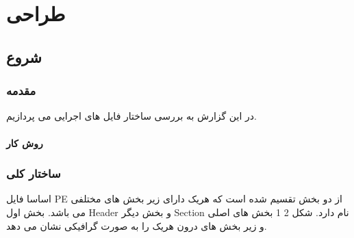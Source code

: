 \documentclass{report}
\begin{document}
    
	\part{طراحی}
	\chapter{شروع}
	\section{مقدمه}
	در این گزارش به بررسی ساختار فایل های اجرایی می پردازیم.
	\subsection{روش کار}
	
	\section{ساختار کلی}
	اساسا فایل PE از دو بخش تقسیم شده است که هریک دارای زیر بخش های مختلفی می باشد. بخش اول Header و بخش دیگر Section نام دارد. شکل ‏2 1 بخش های اصلی و زیر بخش های درون هریک را به صورت گرافیکی نشان می دهد.
	
\end{document}
